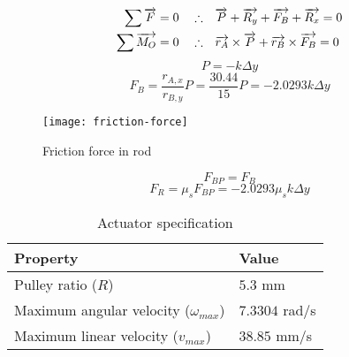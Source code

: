 \begin{align}
    \label{eq:sum-forces}
    \sum \overrightarrow{F}=0 \quad\therefore& \quad \overrightarrow{P} + \overrightarrow{R_y} + \overrightarrow{F_B}+\overrightarrow{R_x} = 0 \\
    \label{eq:sum-momentums}
    \sum \overrightarrow{M_O}=0 \quad\therefore& \quad \overrightarrow{r_A}\times\overrightarrow{P} + \overrightarrow{r_B}\times\overrightarrow{F_B} = 0
\end{align}
\begin{equation}
    \label{eq:force-p}
    P=-k\Delta y
\end{equation}
\begin{equation}
    \label{eq:force-fb}
    F_B = \frac{r_{A,x}}{r_{B,y}}P = \frac{30.44}{15}P=-2.0293k\Delta y
\end{equation}

\begin{figure}
    \centering
    \texttt{[image: friction-force]}
    \caption{Friction force in rod}
    \label{fig:friction-force}
\end{figure}
\begin{equation}
    \label{eq:force-fbp}
    F_{BP}=F_B
\end{equation}
\begin{equation}
    \label{eq:force-fr}
    F_{R}=\mu_{s}F_{BP}=-2.0293\mu_{s}k\Delta y
\end{equation}

\begin{table}[h]
    \centering
    \caption{Actuator specification}
    \label{tab:actuator-specs}
    \begin{tabular}{ll}
    \toprule
    Property & Value \\
    \midrule
    Pulley ratio ($R$) & $5.3$ mm \\
    Maximum angular velocity ($\omega_{max}$) & $7.3304$ rad/s \\
    Maximum linear velocity ($v_{max}$) & $38.85$ mm/s \\
    \bottomrule
    \end{tabular}
\end{table}